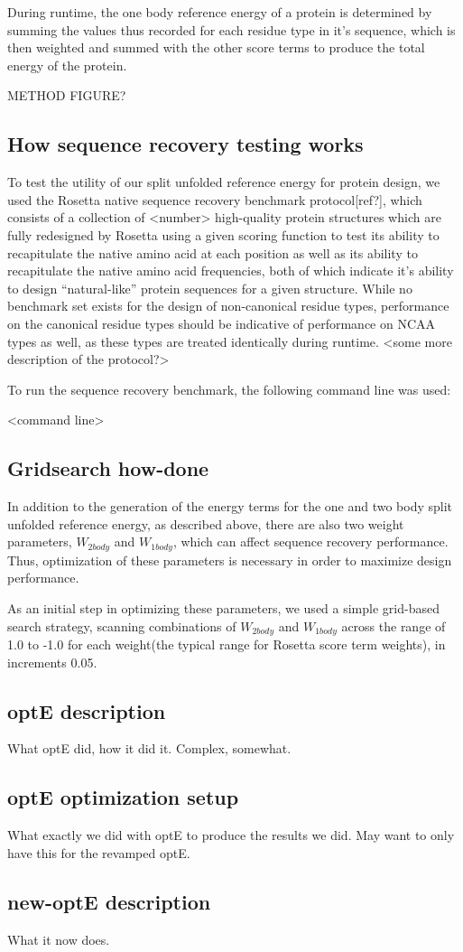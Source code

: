 During runtime, the one body reference energy of a protein is determined by summing the values thus recorded for each residue type in it's sequence, which is then weighted and summed with the other score terms to produce the total energy of the protein.

METHOD FIGURE?


\subsection{How sequence recovery testing works}
To test the utility of our split unfolded reference energy for protein design, we used the Rosetta native sequence recovery benchmark protocol[ref?], which consists of a collection of <number> high-quality protein structures which are fully redesigned by Rosetta using a given scoring function to test its ability to recapitulate the native amino acid at each position as well as its ability to recapitulate the native amino acid frequencies, both of which indicate it's ability to design ``natural-like'' protein sequences for a given structure. While no benchmark set exists for the design of non-canonical residue types, performance on the canonical residue types should be indicative of performance on NCAA types as well, as these types are treated identically during runtime. <some more description of the protocol?>

To run the sequence recovery benchmark, the following command line was used:

<command line>



\subsection{Gridsearch how-done}
In addition to the generation of the energy terms for the one and two body split unfolded reference energy, as described above, there are also two weight parameters, $W_{2body}$ and $W_{1body}$, which can affect sequence recovery performance. Thus, optimization of these parameters is necessary in order to maximize design performance. 

As an initial step in optimizing these parameters, we used a simple grid-based search strategy, scanning combinations of $W_{2body}$ and $W_{1body}$ across the range of 1.0 to -1.0 for each weight(the typical range for Rosetta score term weights), in increments 0.05.


\subsection{optE description}
What optE did, how it did it. Complex, somewhat.

\subsection{optE optimization setup}
What exactly we did with optE to produce the results we did. May want to only have this for the revamped optE.

\subsection{new-optE description}
What it now does.
